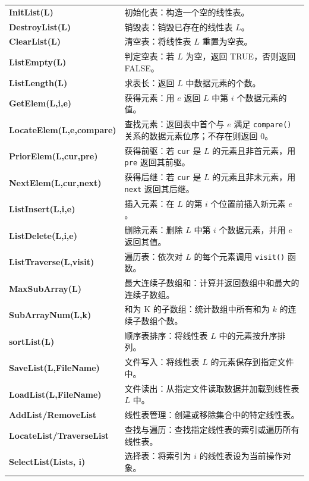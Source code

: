 \documentclass[supercite]{Experimental_Report}
\theoremstyle{definition}
\begin{document}
\noindent
\begin{tabularx}{\textwidth}{p{4.5cm} X} %
	\textbf{InitList(L)} & 初始化表：构造一个空的线性表。 \\
	\textbf{DestroyList(L)} & 销毁表：销毁已存在的线性表 $L$。 \\
	\textbf{ClearList(L)} & 清空表：将线性表 $L$ 重置为空表。 \\
	\textbf{ListEmpty(L)} & 判定空表：若 $L$ 为空，返回 TRUE，否则返回 FALSE。 \\
	\textbf{ListLength(L)} & 求表长：返回 $L$ 中数据元素的个数。 \\
	\textbf{GetElem(L,i,e)} & 获得元素：用 $e$ 返回 $L$ 中第 $i$ 个数据元素的值。 \\
	\textbf{LocateElem(L,e,compare)} & 查找元素：返回表中首个与 $e$ 满足 \texttt{compare()} 关系的数据元素位序；不存在则返回 0。 \\
	\textbf{PriorElem(L,cur,pre)} & 获得前驱：若 \texttt{cur} 是 $L$ 的元素且非首元素，用 \texttt{pre} 返回其前驱。 \\
	\textbf{NextElem(L,cur,next)} & 获得后继：若 \texttt{cur} 是 $L$ 的元素且非末元素，用 \texttt{next} 返回其后继。 \\
	\textbf{ListInsert(L,i,e)} & 插入元素：在 $L$ 的第 $i$ 个位置前插入新元素 $e$。 \\
	\textbf{ListDelete(L,i,e)} & 删除元素：删除 $L$ 中第 $i$ 个数据元素，并用 $e$ 返回其值。 \\
	\textbf{ListTraverse(L,visit)} & 遍历表：依次对 $L$ 的每个元素调用 \texttt{visit()} 函数。 \\
	\textbf{MaxSubArray(L)} & 最大连续子数组和：计算并返回数组中和最大的连续子数组。 \\
	\textbf{SubArrayNum(L,k)} & 和为 K 的子数组：统计数组中所有和为 $k$ 的连续子数组个数。 \\
	\textbf{sortList(L)} & 顺序表排序：将线性表 $L$ 中的元素按升序排列。 \\
	\textbf{SaveList(L,FileName)} & 文件写入：将线性表 $L$ 的元素保存到指定文件中。 \\
	\textbf{LoadList(L,FileName)} & 文件读出：从指定文件读取数据并加载到线性表 $L$ 中。 \\
	\textbf{AddList/RemoveList} & 线性表管理：创建或移除集合中的特定线性表。 \\
	\textbf{LocateList/TraverseList} & 查找与遍历：查找指定线性表的索引或遍历所有线性表。 \\
	\textbf{SelectList(Lists, i)} & 选择表：将索引为 $i$ 的线性表设为当前操作对象。 \\
\end{tabularx}
\end{document}
